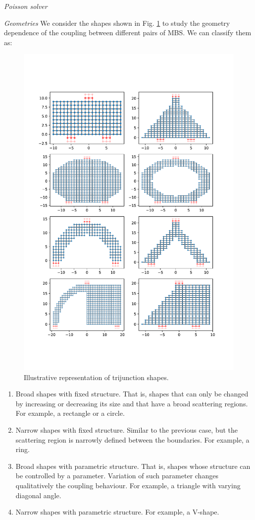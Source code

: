 \documentclass[10pt,twocolumn,aps,superscriptaddress, floatfix,notitlepage]{revtex4-1}
\begin{document}
\textit{Poisson solver}

\textit{Geometries}  We consider the shapes shown in Fig. \ref{fig:shapes} to study the geometry dependence of the coupling between different pairs of MBS. We can classify them as:

\begin{figure}[!h]
  \centering
  \includegraphics[width=0.9\linewidth]{figures/shapes.pdf}
  \caption{Illustrative representation of trijunction shapes.}
  \label{fig:shapes}
\end{figure}

\begin{enumerate}
\item Broad shapes with fixed structure. That is, shapes that can only be changed by increasing or decreasing its size and that have a broad scattering regions. For example, a rectangle or a circle.
\item Narrow shapes with fixed structure. Similar to the previous case, but the scattering region is narrowly defined between the boundaries. For example, a ring.
\item Broad shapes with parametric structure. That is, shapes whose structure can be controlled by a parameter. Variation of such parameter changes qualitatively the coupling behaviour. For example, a triangle with varying diagonal angle.
\item Narrow shapes with parametric structure. For example, a V-shape.
\end{enumerate}
\end{document}
